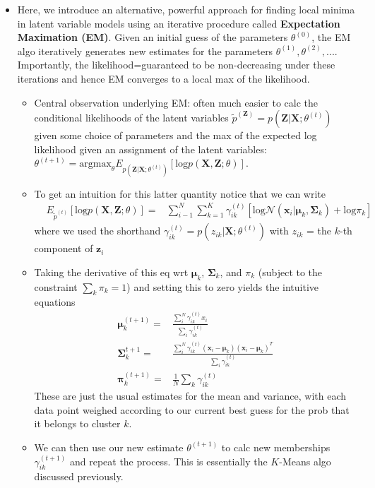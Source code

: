\documentclass[norsk,a4paper,11pt]{article}
\begin{document}
\begin{itemize}
	\item Here, we introduce an alternative, powerful approach for finding local minima in latent variable models using an iterative procedure called \textbf{Expectation Maximation (EM)}. Given an initial guess of the parameters $\theta^{(0)}$, the EM algo iteratively generates new estimates for the parameters $\theta^{(1)}, \theta^{(2)}, ...$. Importantly, the likelihood=guaranteed to be non-decreasing under these iterations and hence EM converges to a local max of the likelihood.
	\begin{itemize}
		\item Central observation underlying EM: often much easier to calc the conditional likelihoods of the latent variables 
		$\tilde{p}^{(\bm{Z})} = p(\bm{Z}|\bm{X}; \theta^{(t)})$ given some choice of parameters and the max of the expected log likelihood given an assignment of the latent variables: $\theta^{(t+1)} = \text{argmax}_\theta E_{p(\bm{Z}|\bm{X}; \theta^{(t)})} [\text{log} p(\bm{X}, \bm{Z}; \theta)]$.
		\item To get an intuition for this latter quantity notice that we can write
		\begin{align}
			& E_{\tilde{p}^{(t)}} [\text{log} p(\bm{X}, \bm{Z}; \theta)]
			=& \sum_{i-1}^N \sum_{k=1}^K \gamma_{ik}^{(t)} [\text{log} \mathcal{N} (\bm{x}_i | \bm{\mu}_k, \bm{\Sigma}_k) + \text{log} \pi_k]
		\end{align}
		where we used the shorthand $\gamma_{ik}^{(t)} = p(z_{ik}| \bm{X}; \theta^{(t)})$ with $z_{ik}$ = the $k$-th component of $\bm{z}_i$
		\item Taking the derivative of this eq wrt $\bm{\mu}_k$, $\bm{\Sigma}_k$, and $\pi_k$ (subject to the constraint $\sum_k \pi_k = 1$) and setting this to zero yields the intuitive equations
		\begin{align}
			\bm{\mu}_k^{(t+1)} =& \frac{\sum_i^N \gamma_{ik}^{(t)} x_i}{\sum_i \gamma_{ik}^{(t)}} \\
			\bm{\Sigma}_k^{t+1} =& \frac{\sum_i^N \gamma_{ik}^{(t)} (\bm{x}_i - \bm{\mu}_k)(\bm{x}_i - \bm{\mu}_k)^T}{\sum_i \gamma_{ik}^{(t)}} \\
			\bm{\pi}_k^{(t+1)} =& \frac{1}{N} \sum_k \gamma_{ik}^{(t)}
		\end{align}
		These are just the usual estimates for the mean and variance, with each data point weighed according to our current best guess for the prob that it belongs to cluster $k$. 
		\item We can then use our new estimate $\theta^{(t+1)}$ to calc new memberships $\gamma_{ik}^{(t+1)}$ and repeat the process. This is essentially the $K$-Means algo discussed previously.

\end{itemize}
\end{itemize}
\end{document}
